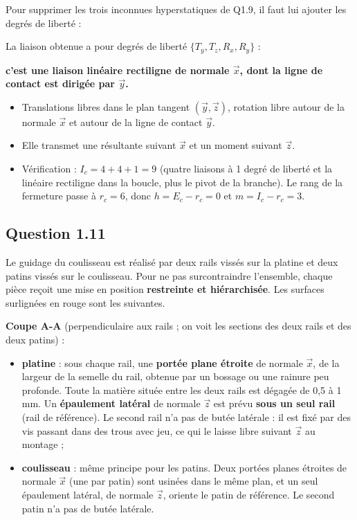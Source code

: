 \documentclass[11pt,a4paper]{article}
\providecommand{\tightlist}{\setlength{\itemsep}{0pt}\setlength{\parskip}{0pt}}
\newcommand{\equationajustee}[1]{%
  \sbox{\boiteequation}{$\displaystyle #1$}%
  \ifdim\wd\boiteequation>\linewidth
    \[\resizebox{\linewidth}{!}{\usebox{\boiteequation}}\]%
  \else
    \[#1\]%
  \fi}
\begin{document}
Pour supprimer les trois inconnues hyperstatiques de Q1.9, il faut lui ajouter les degrés de liberté :

\equationajustee{\boxed{T_z\ (\text{translation suivant } \vec z),\quad R_x,\quad R_y}}

La liaison obtenue a pour degrés de liberté \(\{T_y, T_z, R_x, R_y\}\) :

\textbf{c'est une liaison linéaire rectiligne de normale \(\vec x\), dont la ligne de contact est dirigée par \(\vec y\).}

\begin{itemize}
\tightlist
\item
  Translations libres dans le plan tangent \((\vec y,\vec z)\), rotation libre autour de la normale \(\vec x\) et autour de la ligne de contact \(\vec y\).
\item
  Elle transmet une résultante suivant \(\vec x\) et un moment suivant \(\vec z\).
\item
  Vérification : \(I_c = 4 + 4 + 1 = 9\) (quatre liaisons à 1 degré de liberté et la linéaire rectiligne dans la boucle, plus le pivot de la branche). Le rang de la fermeture passe à \(r_c = 6\), donc \(h = E_c - r_c = 0\) et \(m = I_c - r_c = 3\).
\end{itemize}

\hypertarget{question-1.11}{%
\subsection{Question 1.11}\label{question-1.11}}

Le guidage du coulisseau est réalisé par deux rails vissés sur la platine et deux patins vissés sur le coulisseau. Pour ne pas surcontraindre l'ensemble, chaque pièce reçoit une mise en position \textbf{restreinte et hiérarchisée}. Les surfaces surlignées en rouge sont les suivantes.

\textbf{Coupe A-A} (perpendiculaire aux rails ; on voit les sections des deux rails et des deux patins) :

\begin{itemize}
\tightlist
\item
  \textbf{platine} : sous chaque rail, une \textbf{portée plane étroite} de normale \(\vec x\), de la largeur de la semelle du rail, obtenue par un bossage ou une rainure peu profonde. Toute la matière située entre les deux rails est dégagée de 0,5 à 1 mm. Un \textbf{épaulement latéral} de normale \(\vec z\) est prévu \textbf{sous un seul rail} (rail de référence). Le second rail n'a pas de butée latérale : il est fixé par des vis passant dans des trous avec jeu, ce qui le laisse libre suivant \(\vec z\) au montage ;
\item
  \textbf{coulisseau} : même principe pour les patins. Deux portées planes étroites de normale \(\vec x\) (une par patin) sont usinées dans le même plan, et un seul épaulement latéral, de normale \(\vec z\), oriente le patin de référence. Le second patin n'a pas de butée latérale.
\end{itemize}
\end{document}
